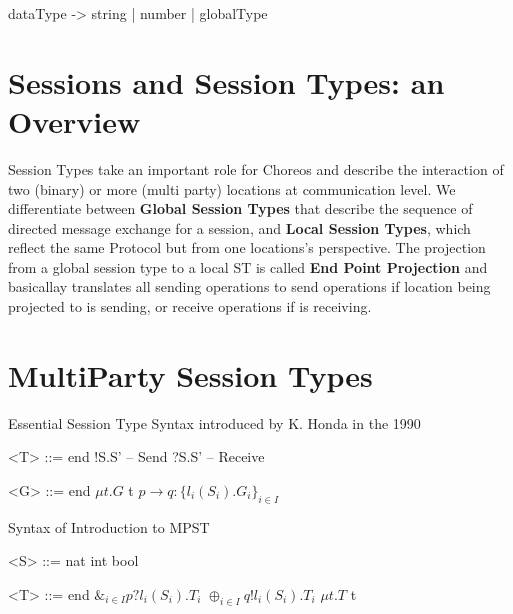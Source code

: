 dataType ->
string
\newline | number
\newline | globalType

\section{Sessions and Session Types:
an Overview}
Session Types take an important role for Choreos and describe the interaction of two (binary) or more (multi party) locations at communication level. We differentiate between \textbf{Global Session Types} that describe the sequence of directed message exchange for a session, and \textbf{Local Session Types}, which reflect the same Protocol but from one locations's perspective. The projection from a global session type to a local ST is called \textbf{End Point Projection} and basicallay translates all sending operations to send operations if location being projected to is sending, or receive operations if is receiving.

\section{MultiParty Session Types}


Essential Session Type Syntax introduced by K. Honda in the 1990

\begin{grammar}

<T> ::= end
	\alt !S.S' -- Send
	\alt ?S.S' -- Receive

\end{grammar}

\begin{grammar}
<G> ::= end
	\alt $\mu t. G$
	\alt t
	\alt $ p \rightarrow q: \{l_i(S_i).G_i\}_{i \in I}$

\end{grammar}


Syntax of Introduction to MPST

\begin{grammar}

<S> ::= nat
	\alt int
	\alt bool

\end{grammar}

\begin{grammar}

<T> ::= end
	\alt $ \&_{i \in I} p?l_i(S_i).T_i$
	\alt $\oplus _{i \in I} q!l_i(S_i).T_i$
	\alt $\mu t.T$
	\alt t

\end{grammar}

